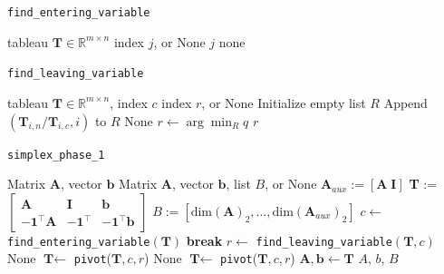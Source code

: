 \documentclass[conference]{IEEEtran}
\begin{document}
    \begin{algorithm}
    \caption{\texttt{find\_entering\_variable}}
    \label{alg:entering}
    \begin{algorithmic}[1]
    \Require tableau $\textbf{T} \in \mathbb{R}^{m \times n}$ 
    \Ensure index $j$, or None
            \State \Return $j$ 
        \EndIf
    \EndFor
    \State \Return none 
    \end{algorithmic}
    \end{algorithm}
    
    \begin{algorithm}
    \caption{\texttt{find\_leaving\_variable}}
    \label{alg:leaving}
    \begin{algorithmic}[1]
    \Require tableau $\textbf{T} \in \mathbb{R}^{m \times n}$, index $c$
    \Ensure index $r$, or None
    \State Initialize empty list $R$
            \State Append $(\textbf{T}_{i, n} / \textbf{T}_{i, c}, i)$ to $R$
        \EndIf
    \EndFor
        \State \Return None 
    \EndIf
    \State $r \gets \arg \min_R q$ 
    \State \Return $r$ 
    \end{algorithmic}
    \end{algorithm}
    
    \begin{algorithm}
    \caption{\texttt{simplex\_phase\_1}}
    \label{alg:phase1}
    \begin{algorithmic}[1]
    \Require Matrix $\textbf{A}$, vector $\textbf{b}$
    \Ensure  Matrix $\textbf{A}$, vector $\textbf{b}$, list $B$, or None
    \State $\textbf{A}_{aux} := [\textbf{A} \; \textbf{I}]$
    \State \textbf{T} := 
    $\begin{bmatrix}
    \textbf{A} & \textbf{I} & \textbf{b} \\
    -\mathbf{1}^\top \textbf{A} & -\mathbf{1}^\top & -\mathbf{1}^\top \textbf{b}
    \end{bmatrix}$
    \State $B := [\text{dim}(\textbf{A})_2,\dots,\text{dim}(\textbf{A}_{aux})_2]$
        \State $c \gets $ \texttt{find\_entering\_variable}$(\textbf{T})$
            \State \textbf{break}
        \EndIf
        \State  $r \gets $ \texttt{find\_leaving\_variable}$(\textbf{T},c)$
            \State \Return None 
        \EndIf
        \State $\textbf{T} \gets $ \texttt{pivot}($\textbf{T},c,r$)
    \EndWhile
     
        \State \Return None 
    \EndIf
    \State $\textbf{T} \gets $ \texttt{pivot}($\textbf{T},c,r$) 
    \State $\textbf{A}, \textbf{b} \gets \textbf{T}$
    \State \Return $A$, $b$, $B$
    \end{algorithmic}
    \end{algorithm}
    
\end{document}
